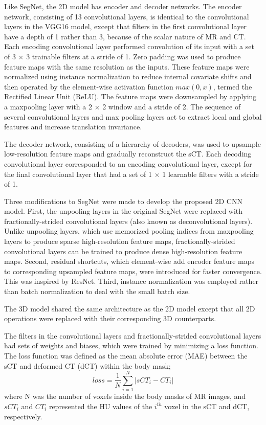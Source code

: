 Like SegNet, the 2D model has encoder and decoder networks. The encoder network, consisting of 13 convolutional layers, is identical to the convolutional layers in the VGG16 model{\cite{RN29}}, except that filters in the first convolutional layer have a depth of 1 rather than 3, because of the scalar nature of MR and CT.  Each encoding convolutional layer performed convolution of its input with a set of 3 $\times$ 3 trainable filters at a stride of 1. Zero padding was used to produce feature maps with the same resolution as the inputs. These feature maps were normalized using instance normalization\cite{RN34} to reduce internal covariate shifts and then operated by the element-wise activation function $max(0,x)$, termed the Rectified Linear Unit (ReLU). The feature maps were downsampled by applying a maxpooling layer with a 2 $\times$ 2 window and a stride of 2. The sequence of several convolutional layers and max pooling layers act to extract local and global features and increase translation invariance. 

The decoder network, consisting of a hierarchy of decoders, was used to upsample low-resolution feature maps and gradually reconstruct the sCT. Each decoding convolutional layer corresponded to an encoding convolutional layer, except for the final convolutional layer that had a set of 1 $\times$ 1 learnable filters with a stride of 1.


Three modifications to SegNet\cite{RN27} were made to develop the proposed 2D CNN model. First, the unpooling layers in the original SegNet\cite{RN27} were replaced with fractionally-strided convolutional layers (also known as deconvolutional layers). Unlike unpooling layers, which use memorized pooling indices from maxpooling layers to produce sparse high-resolution feature maps, fractionally-strided convolutional layers can be trained to produce dense high-resolution feature maps.\cite{RN35} Second, residual shortcuts, which element-wise add encoder feature maps to corresponding upsampled feature maps, were introduced for faster convergence. This was inspired by ResNet{\cite{RN36}}. Third, instance normalization\cite{RN34} was employed rather than batch normalization\cite{RN37} to deal with the small batch size. 

The 3D model shared the same architecture as the 2D model except that all 2D operations were replaced with their corresponding 3D counterparts.

The filters in the convolutional layers and fractionally-strided convolutional layers had sets of weights and biases, which were trained by minimizing a loss function. The loss function was defined as the mean absolute error (MAE) between the sCT and deformed CT (dCT) within the body mask;
\begin{equation}
\label{eq1}
loss = \frac{1}{N}\sum_{i=1}^{N}|sCT_{i}-CT_{i}|
\end{equation}
where N was the number of voxels inside the body masks of MR images, and $sCT_{i}$ and $CT_{i}$ represented the HU values of the $i^{th}$ voxel in the sCT and dCT, respectively.

